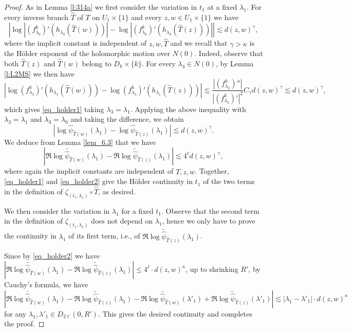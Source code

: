 \documentclass[11pt]{amsart}
\theoremstyle{plain}
\theoremstyle{definition}
\theoremstyle{remark}
\begin{document}
\begin{proof}
As in Lemma \ref{l:314a}
we first consider the variation in $t_1$ at a fixed $\lambda_1$. 
For 
every
inverse branch $\hat T$ of $T$ on
$U_1\times \{1\}$
and
every $z,w\in
U_1\times \{1\}$
we have
\begin{equation}\label{eq_holder1}
\left|\log |(f_{\lambda_0}^k)'(h_{\lambda_0}(\hat{T}
 (w)))|
- \log |(f_{\lambda_0}^k)'(h_{\lambda_0}(\hat{T}
 (z)))|
\right|
\lesssim 
d(z,w)^\gamma,
\end{equation}
where the implicit constant is independent of 
$z,w,\hat T$ and
we recall that $\gamma >\kappa$ is the 
H\"older exponent of 
the holomorphic motion over $N(0)$.
Indeed,
observe that both $\hat T ( z)$ and $\hat T (w)$ belong to
$D_k\times \{k\}$.
For every
$\lambda_3\in N(0)$,
by 
Lemma 
\ref{l:L2MS}
we then have
\[
\left|
\log (f_{\lambda_3}^k)'(h_{\lambda_1}(\hat{T}
(w))) - \log (f_{\lambda_3}^k)'(h_{\lambda_1}(\hat{T}
(z)))\right|
\lesssim \frac{|(f_{\lambda_3}^k)''|}{|(f_{\lambda_3}^k)'|^ 2} C_\gamma
d(z, w)^\gamma
\lesssim
d(z, w)^\gamma,
\]
which gives 
\eqref{eq_holder1}
taking $\lambda_3=\lambda_1$.
Applying the above inequality with $\lambda_3=\lambda_1$ and $\lambda_3=\lambda_0$ and taking the difference, we obtain
\[
|\log \hat{\psi}_{\hat{T}(w)}
(\lambda_1) - 
\log \hat{\psi}_{\hat{T}(z)}
(\lambda_1)| \lesssim 
d(z,w)^\gamma.\]
We deduce from
Lemma \ref{lem_6.3} that we have
\begin{equation}\label{eq_holder2}
|\Re \widetilde{\log \hat{\psi}_{\hat{T}(w)}}(\lambda_1) - \Re \widetilde{\log \hat{\psi}_{\hat{T}(z)}}(\lambda_1)| \lesssim 
4^\ell d(z,w)^\gamma,
\end{equation}
where again the implicit constants 
are independent of
$\hat T,z,w$.
Together,
\eqref{eq_holder1} and \eqref{eq_holder2} give the H\"older continuity in $t_1$
of the two terms in the definition of $\zeta_{(t_1,\lambda_1)} \circ \hat{T}$, as desired.




\medskip

We then consider the variation in
$\lambda_1$ for a fixed $t_1$.
Observe that the second term in the definition of $\zeta_{(t_1,\lambda_1)}$ does not depend on $\lambda_1$, hence we only have to prove the continuity in $\lambda_1$ of its first term, i.e., of
$\Re \widetilde{\log \hat{\psi}_{\hat{T}(z)}}(\lambda_1)$.



Since by \eqref{eq_holder2} 
we  
have
$|\Re \widetilde{\log \hat{\psi}_{\hat{T}
(w)}}(\lambda_1) - \Re \widetilde{\log \hat{\psi}_{\hat{T}
(z)}}(\lambda_1)| \le 4^\ell\cdot 
d(z,w)^\kappa$, 
up to shrinking $R'$,
by Cauchy's formula, 
we have
$$|\Re \widetilde{\log \hat{\psi}_{\hat{T}
(w)}}(\lambda_1) - \Re \widetilde{\log \hat{\psi}_{\hat{T}
(z)}}(\lambda_1)-\Re \widetilde{\log \hat{\psi}_{\hat{T}
(w)}}(\lambda'_1) + \Re \widetilde{\log \hat{\psi}_{\hat{T}
(z)}}(\lambda'_1)| \lesssim
|\lambda_1-\lambda'_1|
\cdot
d(z,w)^\kappa
$$
for any $\lambda_1,\lambda'_1 \in D_{2\ell}(0,R')$. This gives the desired continuity and completes the proof.
\end{proof}
\end{document}
